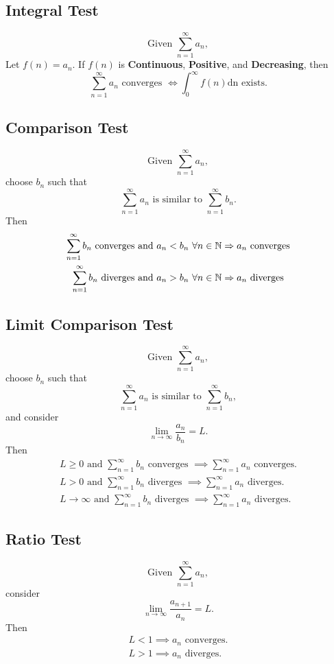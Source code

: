 \subsection*{Integral Test}
\[
\text{Given }\sum_{n=1}^{\infty}a_{n},
\]
Let $f(n)=a_{n}$. If $f(n)$ is \textbf{Continuous}, \textbf{Positive}, and \textbf{Decreasing}, then
\[
\sum_{n=1}^{\infty}a_{n} \text{ converges } \iff \int_{0}^{\infty}f(n)\text{dn}\text{ exists.}
\]

\subsection*{Comparison Test}
\[
    \text{Given }\sum_{n=1}^{\infty}a_{n},
\]
choose $b_{n}$ such that
\[
    \sum_{n=1}^{\infty}a_{n}\text{ is similar to }\sum_{n=1}^{\infty}b_{n}.
\]
Then
\begin{gather*}
    \sum_{n=1}^{\infty}b_{n} \text{ converges and } a_{n} < b_{n}\ \forall n\in\NN\implies a_{n}\text{ converges}\\
    \sum_{n=1}^{\infty}b_{n} \text{ diverges and } a_{n} > b_{n}\ \forall n\in\NN\implies a_{n}\text{ diverges}\\
\end{gather*}

\subsection*{Limit Comparison Test}
\[
\text{Given }\sum_{n=1}^{\infty}a_{n},
\]
choose $b_{n}$ such that
\[
    \sum_{n=1}^{\infty}a_{n}\text{ is similar to }\sum_{n=1}^{\infty}b_{n},
\]
and consider
\[
    \lim_{n\to\infty}\frac{a_{n}}{b_{n}} = L.
\]
Then
\begin{gather*}
    L \geq 0 \text{ and } \sum_{n=1}^{\infty}b_{n}\text{ converges }\implies\sum_{n=1}^{\infty}a_{n}\text{ converges}.\\
    L > 0\text{ and }\sum_{n=1}^{\infty}b_{n}\text{ diverges }\implies\sum_{n=1}^{\infty}a_{n}\text{ diverges}.\\
    L\to\infty\text{ and }\sum_{n=1}^{\infty}b_{n}\text{ diverges }\implies\sum_{n=1}^{\infty}a_{n}\text{ diverges}.
\end{gather*}

\subsection*{Ratio Test}
\[
\text{Given }\sum_{n=1}^{\infty}a_{n},
\]
consider
\[
\lim_{n\to\infty}\frac{a_{n+1}}{a_{n}}=L.
\]
Then
\begin{gather*}
    L < 1 \implies a_{n}\text{ converges}.\\
    L > 1 \implies a_{n}\text{ diverges}.
\end{gather*}

